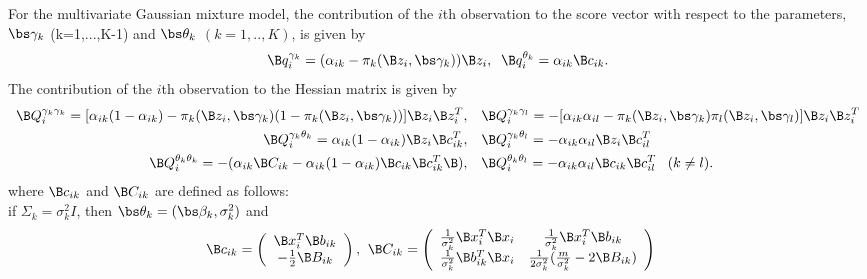 \begin{theorem}
For the multivariate Gaussian mixture model, the contribution of the $i$th observation to the score vector with respect to the parameters, $\bs\gamma_{k}$ (k=1,...,K-1) and $\bs\theta_{k}$ $(k=1,..,K)$, is given by
\begin{align*}
\B q_{i}^{\gamma_{k}}=(\alpha_{ik}-\pi_{k}(\B z_{i},\bs\gamma_{k}))\B z_{i},\;\; \B q_{i}^{\theta_{k}}=\alpha_{ik}\B c_{ik}.
\end{align*}
The contribution of the $i$th observation to the Hessian matrix is given by
\begin{align*}
\B Q_{i}^{\gamma_{k}\gamma_{k}}=[\alpha_{ik}(1-\alpha_{ik})-\pi_{k}(\B z_{i},\bs\gamma_{k})(1-\pi_{k}(\B z_{i},\bs\gamma_{k}))]\B z_{i}\B z_{i}^{T},& \quad \B Q_{i}^{\gamma_{k}\gamma_{l}}=-[\alpha_{ik}\alpha_{il}-\pi_{k}(\B z_{i},\bs\gamma_{k})\pi_{l}(\B z_{i},\bs\gamma_{l})]\B z_{i}\B z_{i}^{T}\\
\B Q_{i}^{\gamma_{k}\theta_{k}}=\alpha_{ik}(1-\alpha_{ik})\B z_{i}\B c_{ik}^{T},&\quad \B Q_{i}^{\gamma_{k}\theta_{l}}=-\alpha_{ik}\alpha_{il}\B z_{i}\B c_{il}^{T}\\
\B Q_{i}^{\theta_{k}\theta_{k}}=-(\alpha_{ik}\B C_{ik}-\alpha_{ik}(1-\alpha_{ik})\B c_{ik}\B c_{ik}^{T}\B ),&\quad \B Q_{i}^{\theta_{k}\theta_{l}}=-\alpha_{ik}\alpha_{il}\B c_{ik}\B c_{il}^{T}\;\;\;(k\not=l).
\end{align*}
where $\B c_{ik}$ and $\B C_{ik}$ are defined as follows:\\

if $\Sigma_{k}=\sigma_{k}^{2}I$, then $\bs\theta_{k}=(\bs\beta_{k},\sigma^{2}_{k})$ and
\begin{align*}
\B c_{ik}=\left( \begin{array}{c}\B x_{i}^{T}\B b_{ik}\\ -\frac{1}{2} \B B_{ik}\end{array}\right),&\;\;
\B C_{ik}=\left(\begin{array}{cc} \frac{1}{\sigma^{2}_{k}}\B x_{i}^{T}\B x_{i}&\frac{1}{\sigma^{2}_{k}}\B x_{i}^{T}\B b_{ik}\\ \frac{1}{\sigma^{2}_{k}}\B b^{T}_{ik}\B x_{i}&\frac{1}{2\sigma^{2}_{k}}(\frac{m}{\sigma^{2}_{k}}-2\B B_{ik})\end{array} \right)
\end{align*}


\end{theorem}
